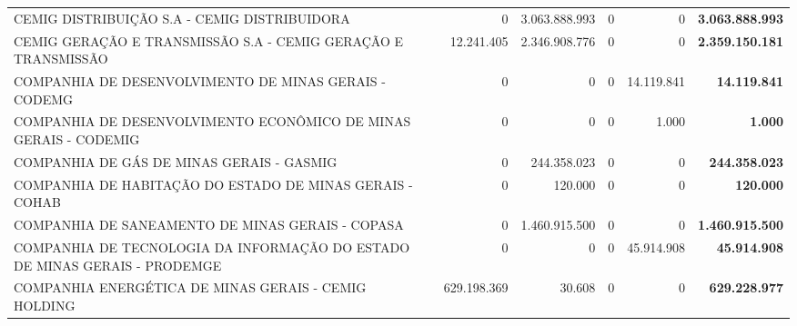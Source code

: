 \documentclass{article}
\begin{document}
\begin{longtable}[c]{m{5.5cm}|m{2.5cm}|m{2.5cm}|m{2.5cm}|m{2cm}|m{2cm}}
\multicolumn{1}{L{5.5cm}|}{CEMIG DISTRIBUIÇÃO S.A - CEMIG DISTRIBUIDORA} & \multicolumn{1}{r|}{          0} & \multicolumn{1}{r|}{3.063.888.993} & \multicolumn{1}{r|}{0} & \multicolumn{1}{r|}{          0} & \multicolumn{1}{r}{ \textbf{3.063.888.993}} \\
\multicolumn{1}{L{5.5cm}|}{CEMIG GERAÇÃO E TRANSMISSÃO S.A - CEMIG GERAÇÃO E TRANSMISSÃO} & \multicolumn{1}{r|}{12.241.405} & \multicolumn{1}{r|}{2.346.908.776} & \multicolumn{1}{r|}{0} & \multicolumn{1}{r|}{          0} & \multicolumn{1}{r}{ \textbf{2.359.150.181}} \\
\multicolumn{1}{L{5.5cm}|}{COMPANHIA DE DESENVOLVIMENTO DE MINAS GERAIS - CODEMG} & \multicolumn{1}{r|}{          0} & \multicolumn{1}{r|}{            0} & \multicolumn{1}{r|}{0} & \multicolumn{1}{r|}{14.119.841} & \multicolumn{1}{r}{ \textbf{14.119.841}} \\
\multicolumn{1}{L{5.5cm}|}{COMPANHIA DE DESENVOLVIMENTO ECONÔMICO DE MINAS GERAIS - CODEMIG} & \multicolumn{1}{r|}{          0} & \multicolumn{1}{r|}{            0} & \multicolumn{1}{r|}{0} & \multicolumn{1}{r|}{1.000} & \multicolumn{1}{r}{ \textbf{1.000}} \\
\multicolumn{1}{L{5.5cm}|}{COMPANHIA DE GÁS DE MINAS GERAIS - GASMIG} & \multicolumn{1}{r|}{          0} & \multicolumn{1}{r|}{244.358.023} & \multicolumn{1}{r|}{0} & \multicolumn{1}{r|}{          0} & \multicolumn{1}{r}{ \textbf{244.358.023}} \\
\multicolumn{1}{L{5.5cm}|}{COMPANHIA DE HABITAÇÃO DO ESTADO DE MINAS GERAIS - COHAB} & \multicolumn{1}{r|}{          0} & \multicolumn{1}{r|}{120.000} & \multicolumn{1}{r|}{0} & \multicolumn{1}{r|}{          0} & \multicolumn{1}{r}{ \textbf{120.000}} \\
\multicolumn{1}{L{5.5cm}|}{COMPANHIA DE SANEAMENTO DE MINAS GERAIS - COPASA} & \multicolumn{1}{r|}{          0} & \multicolumn{1}{r|}{1.460.915.500} & \multicolumn{1}{r|}{0} & \multicolumn{1}{r|}{          0} & \multicolumn{1}{r}{ \textbf{1.460.915.500}} \\
\multicolumn{1}{L{5.5cm}|}{COMPANHIA DE TECNOLOGIA DA INFORMAÇÃO DO ESTADO DE MINAS GERAIS - PRODEMGE} & \multicolumn{1}{r|}{          0} & \multicolumn{1}{r|}{            0} & \multicolumn{1}{r|}{0} & \multicolumn{1}{r|}{45.914.908} & \multicolumn{1}{r}{ \textbf{45.914.908}} \\
\multicolumn{1}{L{5.5cm}|}{COMPANHIA ENERGÉTICA DE MINAS GERAIS - CEMIG HOLDING} & \multicolumn{1}{r|}{629.198.369} & \multicolumn{1}{r|}{30.608} & \multicolumn{1}{r|}{0} & \multicolumn{1}{r|}{          0} & \multicolumn{1}{r}{ \textbf{629.228.977}} \\

\end{longtable}
\end{document}
